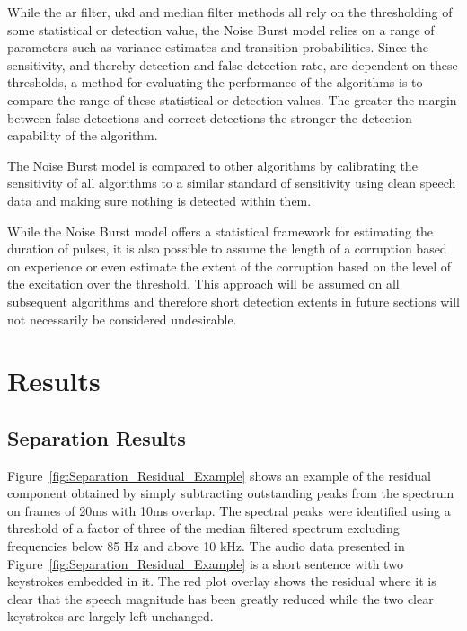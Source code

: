 While the \gls{ar} filter, \gls{ukd} and median filter methods all rely on the thresholding of some statistical or detection value, the Noise Burst model relies on a range of parameters such as variance estimates and transition probabilities. Since the sensitivity, and thereby detection and false detection rate, are dependent on these thresholds, a method for evaluating the performance of the algorithms is to compare the range of these statistical or detection values. The greater the margin between false detections and correct detections the stronger the detection capability of the algorithm.

The Noise Burst model is compared to other algorithms by calibrating the sensitivity of all algorithms to a similar standard of sensitivity using clean speech data and making sure nothing is detected within them.

While the Noise Burst model offers a statistical framework for estimating the duration of pulses, it is also possible to assume the length of a corruption based on experience or even estimate the extent of the corruption based on the level of the excitation over the threshold. This approach will be assumed on all subsequent algorithms and therefore short detection extents in future sections will not necessarily be considered undesirable.

\section{Results}\label{sec:WPresults}
\subsection{Separation Results} %
Figure~\ref{fig:Separation_Residual_Example} shows an example of the residual component obtained by simply subtracting outstanding peaks from the spectrum on frames of 20ms with 10ms overlap. The spectral peaks were identified using a threshold of a factor of three of the median filtered spectrum excluding frequencies below 85 Hz and above 10 kHz. The audio data presented in Figure~\ref{fig:Separation_Residual_Example} is a short sentence with two keystrokes embedded in it. The red plot overlay shows the residual where it is clear that the speech magnitude has been greatly reduced while the two clear keystrokes are largely left unchanged. 

